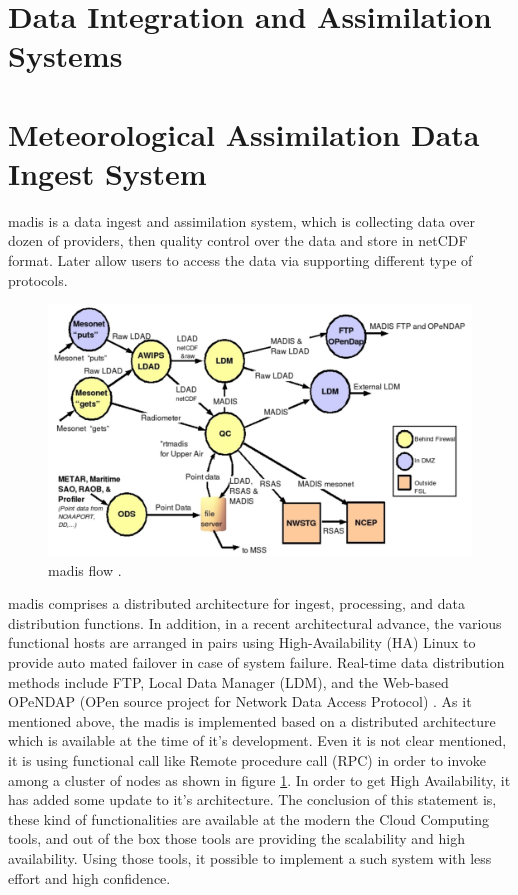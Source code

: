 \section{Data Integration and Assimilation Systems}
\label{se:dias}

\section{Meteorological Assimilation Data Ingest System}
\label{se:madis}
\acrfull{madis} is a data ingest and assimilation system, which is collecting data over dozen of providers, then quality control over the data and store in \acrshort{netCDF} format. Later allow users to access the data via supporting different type of protocols.

\begin{figure}[htp]
    \centering
    \includegraphics[width=1\textwidth]{lit/other/madis_flow.png}
    \caption[\acrshort{madis} flow]{\acrshort{madis} flow \cite{Macdermaid2005ARCHITECTUREP2.39}.}
    \label{fi:madis_flow}
\end{figure}

\acrshort{madis} comprises a distributed architecture for ingest, processing, and data distribution functions.
In addition, in a recent architectural advance, the various functional hosts are arranged in pairs using High-Availability (HA) Linux to provide auto mated failover in case of system failure. Real-time data distribution methods include FTP, Local Data Manager (LDM), and the Web-based OPeNDAP (OPen source project for Network Data Access Protocol) \cite{Macdermaid2005ARCHITECTUREP2.39}. As it mentioned above, the \acrshort{madis} is implemented based on a distributed architecture which is available at the time of it's development. Even it is not clear mentioned, it is using functional call like Remote procedure call (RPC) in order to invoke among a cluster of nodes as shown in figure \ref{fi:madis_flow}. In order to get High Availability, it has added some update to it's architecture. The conclusion of this statement is, these kind of functionalities are available at the modern the Cloud Computing tools, and out of the box those tools are providing the scalability and high availability. Using those tools, it possible to implement a such system with less effort and high confidence.

